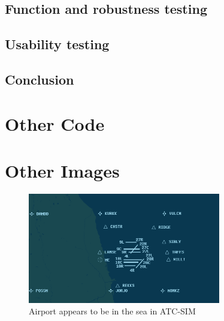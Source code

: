 \documentclass{article}
\begin{document}
\subsection{Function and robustness testing}


\subsection{Usability testing}


\subsection{Conclusion}



\clearpage

\printbibliography
{}

\printglossaries

\begin{appendices}
\section{Other Code}\label{appendix:otherfunctions}


\section{Other Images}\label{appendix:otherimages}
\begin{figure}[H]
\centering
\includegraphics[width=0.75\textwidth]{existing_solutions/airportinseaatcsim.png}
\caption{\label{fig:airportinseaatcsim}Airport appears to be in the sea in ATC-SIM}
\end{figure}
\end{appendices}
\end{document}
